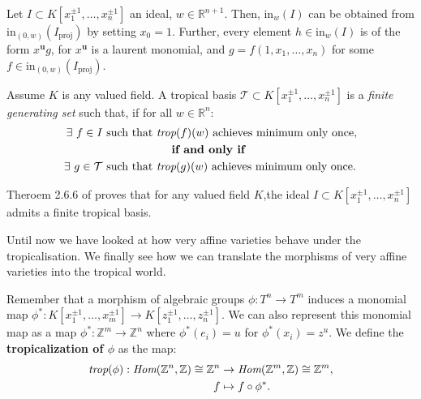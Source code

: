 \begin{proposition}
    Let $I \subset  K[x_{1}^{\pm1}, \dots, x_{n}^{\pm1}]$ an ideal, $w \in \mathbb{R}^{n+1}$.
    Then, $\text{in}_{w}(I)$ can be obtained from $\text{in}_{(0,w)}(I_{\text{proj}})$ by setting $x_{0} = 1$.
    Further, every element $h \in \text{in}_{w}(I)$ is of the form $x^{\textbf{u}}g$, for $x^{\textbf{u}}$ is a laurent monomial, and $g = f(1, x_{1},\dots, x_{n})$ for some $f \in \text{in}_{(0,w)}(I_{\text{proj}})$.
\end{proposition}

\begin{definition}
   Assume $K$ is any valued field.
   A tropical basis $\mathcal{T}\subset K[x_1^{\pm 1},\allowbreak \dots,\allowbreak x_n^{\pm 1}]$ is a \textit{finite generating set} such that, if for all $w \in \mathbb{R}^{n}$:
    \begin{align*}
        \exists ~f \in I~\text{such that }&\emph{trop}(f)(w)~\text{achieves minimum only once},\\
                                                          &~~~~\textbf{if and only if}\\
        \exists ~g \in \mathcal{T}~\text{such that }&\emph{trop}(g)(w)~\text{achieves minimum only once}.
    \end{align*}
\end{definition}

\begin{remark}
    Theroem 2.6.6 of \cite{maclagan2015introduction} proves that for any valued field $K$,the ideal $I \subset  K[x_{1}^{\pm1}, \dots, x_{n}^{\pm1}]$ admits a finite tropical basis.
\end{remark}

Until now we have looked at how very affine varieties behave under the tropicalisation.
We finally see how we can translate the morphisms of very affine varieties into the tropical world.

\begin{definition}
    \par Remember that a morphism of algebraic groups $\phi : T^{n}\to T^{m}$ induces a monomial map $\phi^{*}:K[x_1^{\pm 1}, \dots, x_m^{\pm 1}]\to K[z_1^{\pm 1}, \dots, z_n^{\pm 1}]$. 
    We can also represent this monomial map as a map $\phi^{*}: \mathbb{Z}^{m}\to \mathbb{Z}^{n}$ where $\phi^{*}(e_i) = u$ for $\phi^{*}(x_i) = z^u$. 
    We define the \textbf{tropicalization of $\phi$} as the map:
    \begin{align*}
        \emph{trop}(\phi): \emph{Hom}(\mathbb{Z}^{n},\mathbb{Z})\cong \mathbb{Z}^{n} &\to \emph{Hom}(\mathbb{Z}^{m},\mathbb{Z})\cong \mathbb{Z}^{m},\\
        f &\mapsto f \circ \phi^{*}.
    \end{align*}
\end{definition}

